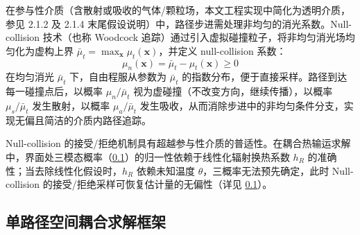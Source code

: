 在参与性介质（含散射或吸收的气体/颗粒场，本文工程实现中简化为透明介质，参见 2.1.2 及 2.1.4 末尾假设说明）中，路径步进需处理非均匀的消光系数。Null-collision 技术\cite{galtierIntegralFormulationNullcollision2013}（也称 Woodcock 追踪）通过引入虚拟碰撞粒子，将非均匀消光场均匀化为虚构上界 $\bar{\mu}_t = \max_{\mathbf{x}} \mu_t(\mathbf{x})$，并定义 null-collision 系数：
\begin{equation}
    \mu_n(\mathbf{x}) = \bar{\mu}_t - \mu_t(\mathbf{x}) \geq 0
    \label{eq:null_collision}
\end{equation}
在均匀消光 $\bar{\mu}_t$ 下，自由程服从参数为 $\bar{\mu}_t$ 的指数分布，便于直接采样。路径到达每一碰撞点后，以概率 $\mu_n/\bar{\mu}_t$ 视为虚碰撞（不改变方向，继续传播），以概率 $\mu_s/\bar{\mu}_t$ 发生散射，以概率 $\mu_a/\bar{\mu}_t$ 发生吸收，从而消除步进中的非均匀条件分支，实现无偏且简洁的介质内路径追踪。

Null-collision 的接受/拒绝机制具有超越参与性介质的普适性。在耦合热输运求解中，界面处三模态概率（\ref{sec:coupled_framework}）的归一性依赖于线性化辐射换热系数 $h_R$ 的准确性；当去除线性化假设时，$h_R$ 依赖未知温度 $\theta$，三概率无法预先确定，此时 Null-collision 的接受/拒绝采样可恢复估计量的无偏性（详见 \ref{sec:coupled_framework}）。

\subsection{单路径空间耦合求解框架}
\label{sec:coupled_framework}

